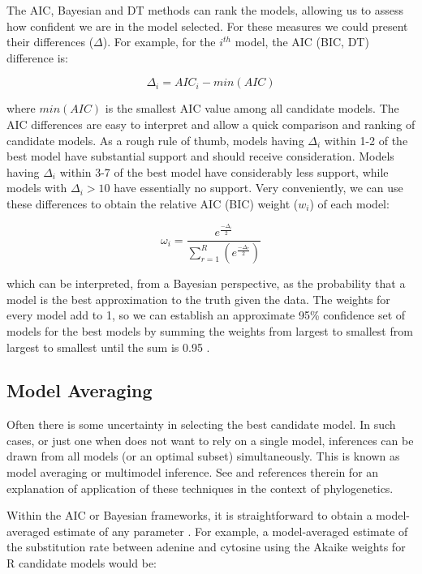 The AIC, Bayesian and DT methods can rank the models, allowing us to assess how confident
we are in the model selected. For these measures we could present their differences ($\Delta$).
For example, for the $i^{th}$ model, the AIC (BIC, DT) difference is:

\[
\Delta_i = AIC_i - min(AIC)
\]

where $min(AIC)$ is the smallest AIC value among all candidate models.
The AIC differences are easy to interpret and allow a quick comparison and ranking of candidate models.
As a rough rule of thumb, models having $\Delta_i$ within 1-2 of the best model have
substantial support and should receive consideration.
Models having $\Delta_i$ within 3-7 of the best model have considerably less support,
while models with $\Delta_i > 10$ have essentially no support.
Very conveniently, we can use these differences to obtain the relative AIC (BIC) weight ($w_i$) of each model:

\[
\omega_i = \frac{e^{\frac{-\Delta_i}{2}}}{\sum_{r=1}^R(e^\frac{-\Delta_r}{2})}
\]

which can be interpreted, from a Bayesian perspective, as the probability that
a model is the best approximation to the truth given the data.
The weights for every model add to 1, so we can establish an approximate 95\% confidence set of models
for the best models by summing the weights from largest to smallest from largest to smallest
until the sum is 0.95 \citep{Burnham-1998, Burnham-2003}.

\subsection{Model Averaging}
\label{sec:model-averaging}

Often there is some uncertainty in selecting the best candidate model.
In such cases, or just one when does not want to rely on a single model,
inferences can be drawn from all models (or an optimal subset) simultaneously.
This is known as model averaging or multimodel inference.
See \citet{Posada-2004} and references therein for an explanation of application
of these techniques in the context of phylogenetics.

Within the AIC or Bayesian frameworks, it is straightforward to obtain a model-averaged
estimate of any parameter \citep{Madigan-1994, Raftery-1996, Hoeting-1999, Wasserman-2000, Burnham-2003, Posada-2003}.
For example, a model-averaged estimate of the substitution rate between
adenine and cytosine using the Akaike weights for R candidate models would be:

